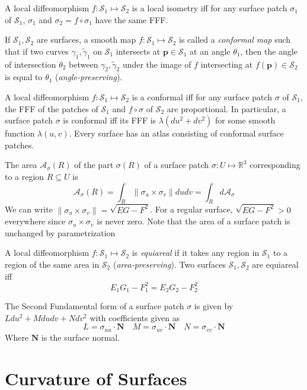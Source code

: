 \documentclass[12pt]{article}
\begin{document}
\begin{multicols*}{2}
A local diffeomorphism $f: \mathcal{S}_1 \mapsto \mathcal{S}_2$ is a local isometry iff for any surface patch $\sigma_1$ of $\mathcal{S}_1$, $\sigma_1$ and $\sigma_2 = f \circ \sigma_1$ have the same FFF.

If $\mathcal{S}_1, \mathcal{S}_2$ are surfaces, a smooth map $f : \mathcal{S}_1 \mapsto \mathcal{S}_2$ is called a \textit{conformal map} such that if two curves $\gamma_1, \tilde{\gamma}_1$ on $\mathcal{S}_1$ intersects at $\mathbf{p} \in \mathcal{S}_1$ at an angle $\theta_1$, then the angle of intersection $\theta_2$ between $\gamma_2, \tilde{\gamma}_2$ under the image of $f$ intersecting at $f(\mathbf{p}) \in \mathcal{S}_2$ is equal to $\theta_1$ (\textit{angle-preserving}).

A local diffeomorphism $f: \mathcal{S}_1 \mapsto \mathcal{S}_2$ is a conformal iff for any surface patch $\sigma$ of $\mathcal{S}_1$, the FFF of the patches of $\mathcal{S}_1$ and $f \circ \sigma$ of $\mathcal{S}_2$ are proportional. In particular, a surface patch $\sigma$ is conformal iff its FFF is $\lambda(du^2 + dv^2)$ for some smooth function $\lambda(u, v)$. Every surface has an atlas consisting of conformal surface patches.

The area $\mathcal{A}_{\sigma}(R)$ of the part $\sigma(R)$ of a surface patch $\sigma : U \mapsto \mathbb{R}^3$ corresponding to a region $R \subseteq U$ is \[\mathcal{A}_\sigma(R) = \int_R\lVert \sigma_u \times \sigma_v \rVert dudv= \int_R d\mathcal{A}_\sigma\] We can write $\lVert \sigma_u \times \sigma_v \rVert = \sqrt{EG-F^2}$. For a regular surface, $\sqrt{EG - F^2} > 0$ everywhere since $\sigma_u \times \sigma_v$ is never zero. Note that the area of a surface patch is unchanged by parametrization

A local diffeomorphism $f: \mathcal{S}_1 \mapsto \mathcal{S}_2$ is \textit{equiareal} if it takes any region in $\mathcal{S}_1$ to a region of the same area in $\mathcal{S}_2$ (\textit{area-preserving}). Two surfaces $\mathcal{S}_1, \mathcal{S}_2$ are equiareal iff \[E_1G_1 - F_1^2 = E_2G_2 - F_2^2\]

The Second Fundamental form of a surface patch $\sigma$ is given by $Ldu^2 + Mdudv + Ndv^2$ with coefficients given as \[L = \sigma_{uu} \cdot \mathbf{N}\quad M = \sigma_{uv} \cdot \mathbf{N} \quad N = \sigma_{vv} \cdot \mathbf{N}\] Where $\mathbf{N}$ is the surface normal.

\section*{Curvature of Surfaces}


\end{multicols*}
\end{document}

